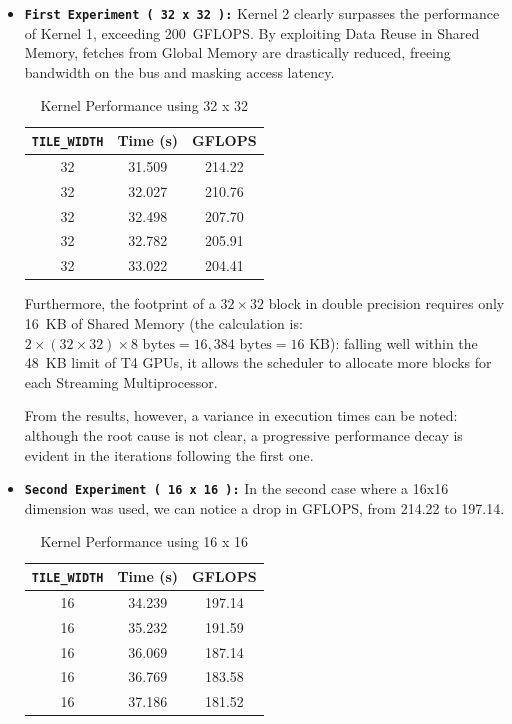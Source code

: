 \begin{itemize}
    \item \textbf{\texttt{First Experiment ( 32 x 32 ):}} Kernel 2 clearly surpasses the performance of Kernel 1, exceeding 200~GFLOPS. By exploiting Data Reuse in Shared Memory, fetches from Global Memory are drastically reduced, freeing bandwidth on the bus and masking access latency. 

    \begin{table}[H]
    \centering
    \begin{tabular}{ccc}
    \toprule
    \texttt{TILE\_WIDTH} & Time (s) & GFLOPS \\
    \midrule
    32 & 31.509 & 214.22 \\
    32 & 32.027 & 210.76 \\
    32 & 32.498 & 207.70 \\
    32 & 32.782 & 205.91 \\
    32 & 33.022 & 204.41 \\
    \bottomrule
    \end{tabular}
    \caption{Kernel Performance using 32 x 32}
    \label{tab:kernel2_15000}
    \end{table}
    
    Furthermore, the footprint of a $32 \times 32$ block in double precision requires only 16~KB of Shared Memory (the calculation is: $2 \times (32 \times 32) \times 8 \text{ bytes} = 16,384 \text{ bytes} = 16 \text{ KB}$): falling well within the 48~KB limit of T4 GPUs, it allows the scheduler to allocate more blocks for each Streaming Multiprocessor. 
    
    From the results, however, a variance in execution times can be noted: although the root cause is not clear, a progressive performance decay is evident in the iterations following the first one.
    

    \item \textbf{\texttt{Second Experiment ( 16 x 16 ):}} In the second case where a 16x16 dimension was used, we can notice a drop in GFLOPS, from 214.22 to 197.14. 

    \begin{table}[H]
    \centering
    \begin{tabular}{ccc}
    \toprule
    \texttt{TILE\_WIDTH} & Time (s) & GFLOPS \\
    \midrule
    16 & 34.239 & 197.14 \\
    16 & 35.232 & 191.59 \\
    16 & 36.069 & 187.14 \\
    16 & 36.769 & 183.58 \\
    16 & 37.186 & 181.52 \\
    \bottomrule
    \end{tabular}
    \caption{Kernel Performance using 16 x 16}
    \label{tab:kernel_16x16}
    \end{table}
    

\end{itemize}
